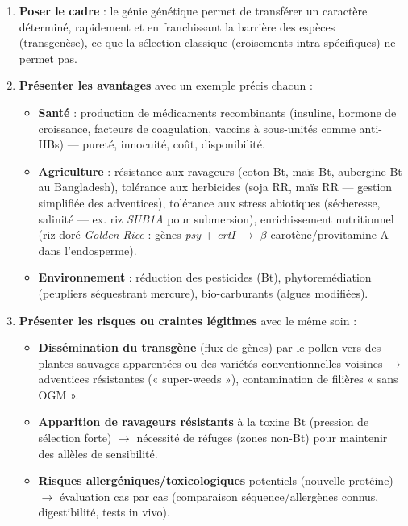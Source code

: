 \documentclass[11pt]{article}
\newcommand{\cle}[1]{{\popxbold\color{popdark}#1}}
\newcounter{popsec}
\newcounter{popsub}
\newcommand{\courssub}[1]{%
  \stepcounter{popsub}%
  \par\vspace{9pt}\noindent{\popxbold\fontsize{11.5}{13}\selectfont\color{popink}{\color{poporange}\thepopsec.\thepopsub}\hspace{6pt}#1}\par\nopagebreak\vspace{4pt}
}
\begin{document}
\courssub{Enjeux et débats autour des OGM}

\begin{methode}
\begin{enumerate}
\item \textbf{Poser le cadre} : le génie génétique permet de transférer un caractère déterminé, rapidement et en franchissant la barrière des espèces (transgenèse), ce que la sélection classique (croisements intra-spécifiques) ne permet pas.
\item \textbf{Présenter les avantages} avec un exemple précis chacun :
      \begin{itemize}
      \item \textbf{Santé} : production de médicaments recombinants (insuline, hormone de croissance, facteurs de coagulation, vaccins à sous-unités comme anti-HBs) — pureté, innocuité, coût, disponibilité.
      \item \textbf{Agriculture} : résistance aux ravageurs (coton Bt, maïs Bt, aubergine Bt au Bangladesh), tolérance aux herbicides (soja RR, maïs RR — gestion simplifiée des adventices), tolérance aux stress abiotiques (sécheresse, salinité — ex. riz \emph{SUB1A} pour submersion), enrichissement nutritionnel (riz doré \emph{Golden Rice} : gènes \emph{psy} + \emph{crtI} $\rightarrow$ $\beta$-carotène/provitamine A dans l'endosperme).
      \item \textbf{Environnement} : réduction des pesticides (Bt), phytoremédiation (peupliers séquestrant mercure), bio-carburants (algues modifiées).
      \end{itemize}
\item \textbf{Présenter les risques ou craintes légitimes} avec le même soin :
      \begin{itemize}
      \item \textbf{Dissémination du transgène} (\cle{flux de gènes}) par le pollen vers des plantes sauvages apparentées ou des variétés conventionnelles voisines $\rightarrow$ adventices résistantes (« super-weeds »), contamination de filières « sans OGM ».
      \item \textbf{Apparition de ravageurs résistants} à la toxine Bt (pression de sélection forte) $\rightarrow$ nécessité de \cle{réfuges} (zones non-Bt) pour maintenir des allèles de sensibilité.
      \item \textbf{Risques allergéniques/toxicologiques} potentiels (nouvelle protéine) $\rightarrow$ évaluation cas par cas (comparaison séquence/allergènes connus, digestibilité, tests in vivo).

\end{itemize}
\end{enumerate}
\end{methode}
\end{document}
